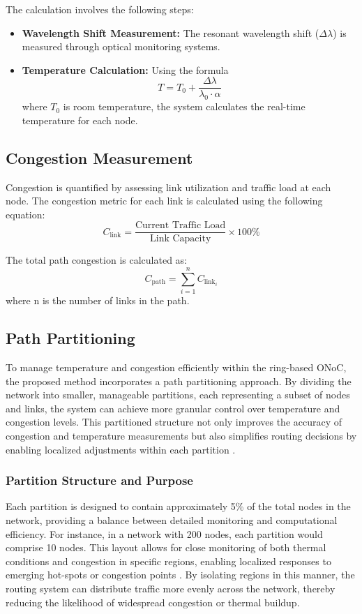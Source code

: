 \documentclass[conference]{IEEEtran}
\begin{document}
The calculation involves the following steps:
\begin{itemize}
    \item \textbf{Wavelength Shift Measurement:} The resonant wavelength shift (\(\Delta \lambda\)) is measured through optical monitoring systems.
    \item \textbf{Temperature Calculation:} Using the formula
    \begin{equation}
    T = T_0 + \frac{\Delta \lambda}{\lambda_0 \cdot \alpha}
    \end{equation}
    where \(T_0\) is room temperature, the system calculates the real-time temperature for each node.
\end{itemize}

\subsection{Congestion Measurement}
Congestion is quantified by assessing link utilization and traffic load at each node. The congestion metric for each link is calculated using the following equation:
\begin{equation}
    C_{\text{link}} = \frac{\text{Current Traffic Load}}{\text{Link Capacity}} \times 100\%
\end{equation}

The total path congestion is calculated as:
\begin{equation}
    C_{\text{path}} = \sum_{i=1}^{n} C_{\text{link}_i}
\end{equation}
where n is the number of links in the path.

\subsection{Path Partitioning}
To manage temperature and congestion efficiently within the ring-based ONoC, the proposed method incorporates a path partitioning approach. By dividing the network into smaller, manageable partitions, each representing a subset of nodes and links, the system can achieve more granular control over temperature and congestion levels. This partitioned structure not only improves the accuracy of congestion and temperature measurements but also simplifies routing decisions by enabling localized adjustments within each partition \cite{alkhatib2023partial}.

\subsubsection{Partition Structure and Purpose}
Each partition is designed to contain approximately 5\% of the total nodes in the network, providing a balance between detailed monitoring and computational efficiency. For instance, in a network with 200 nodes, each partition would comprise 10 nodes. This layout allows for close monitoring of both thermal conditions and congestion in specific regions, enabling localized responses to emerging hot-spots or congestion points \cite{liu2019wavelength}. By isolating regions in this manner, the routing system can distribute traffic more evenly across the network, thereby reducing the likelihood of widespread congestion or thermal buildup.
\end{document}
